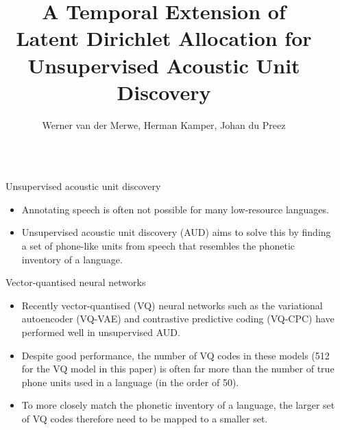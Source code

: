 \documentclass[final]{beamer}
\title{A Temporal Extension of \\Latent Dirichlet Allocation for \\Unsupervised Acoustic Unit Discovery}
\author{Werner van der Merwe, Herman Kamper, Johan du Preez}
\institute{MediaLab, E\&E Engineering, Stellenbosch University, South Africa}
\newlength{\columnheight}
\begin{document}
\begin{frame}[t]
    \begin{columns}[T]

        \begin{column}{.01\linewidth}\end{column} %


        \begin{column}{.33\linewidth}
            \centering
            \begin{minipage}[T]{.97\textwidth}\parbox[t][\columnheight]{\textwidth}{

                    \begin{block}{Unsupervised acoustic unit discovery}

                        \begin{itemize}
                            \vspace{-0.5cm}
                            \setlength{\itemsep}{0.5ex}
                            \item Annotating speech is often not possible for many low-resource languages. 
                            \item Unsupervised acoustic unit discovery (AUD)  aims to solve this by finding a set of phone-like units from speech that resembles the phonetic inventory of a language.
                        \end{itemize}

                    \end{block}

                    \begin{block}{Vector-quantised neural networks}

                        \begin{itemize}
                            \vspace{-0.5cm}
                            \setlength{\itemsep}{0.5ex}
                            \item Recently vector-quantised (VQ) neural networks such as the variational autoencoder (VQ-VAE) and contrastive predictive coding (VQ-CPC) have performed well in unsupervised AUD\@.
                            \item Despite good performance, the number of VQ codes in these models (512 for the VQ model in this paper)
                                  is often far more than the number of true phone units used in a language (in the order of 50).
                            \item To more closely match the phonetic inventory of a language, the larger set of VQ codes therefore need to be mapped to a smaller set.
                        \end{itemize}



\end{block}}
\end{minipage}
\end{column}
\end{columns}
\end{frame}
\end{document}
